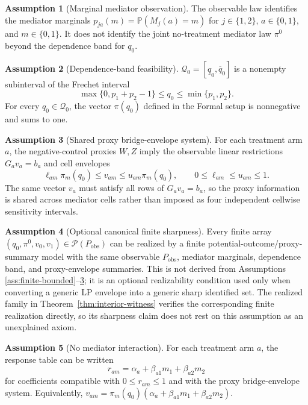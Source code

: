 \documentclass[11pt]{article}
\renewcommand{\Pr}{\mathbb{P}}
\theoremstyle{definition}
\newtheorem{assumption}{Assumption}
\theoremstyle{plain}
\theoremstyle{remark}
\begin{document}
\begin{assumption}[Marginal mediator observation]\label{ass:marginal-mediators}
The observable law identifies the mediator marginals
\(p_{ja}(m)=\Pr(M_j(a)=m)\) for \(j\in\{1,2\}\), \(a\in\{0,1\}\), and
\(m\in\{0,1\}\).  It does not identify the joint no-treatment mediator law
\(\pi^0\) beyond the dependence band for \(q_0\).
\end{assumption}

\begin{assumption}[Dependence-band feasibility]\label{ass:dependence-band}
\(\mathcal Q_0=[\underline q_0,\overline q_0]\) is a nonempty subinterval of
the Frechet interval
\[
  \max\{0,p_1+p_2-1\}\le q_0\le \min\{p_1,p_2\}.
\]
For every \(q_0\in\mathcal Q_0\), the vector \(\pi(q_0)\) defined in the
Formal setup is nonnegative and sums to one.
\end{assumption}

\begin{assumption}[Shared proxy bridge-envelope system]\label{ass:proxy-envelope}
For each treatment arm \(a\), the negative-control proxies \(W,Z\) imply the
observable linear restrictions \(G_a v_a=b_a\) and cell envelopes
\[
  \ell_{am}\pi_m(q_0)\le v_{am}\le u_{am}\pi_m(q_0),
  \qquad 0\le \ell_{am}\le u_{am}\le1 .
\]
The same vector \(v_a\) must satisfy all rows of \(G_a v_a=b_a\), so the proxy
information is shared across mediator cells rather than imposed as four
independent cellwise sensitivity intervals.
\end{assumption}

\begin{assumption}[Optional canonical finite sharpness]\label{ass:canonical-sharpness}
Every finite array \((q_0,\pi^0,v_0,v_1)\in\mathcal P(P_{\mathrm{obs}})\)
can be realized by a finite potential-outcome/proxy-summary model with the
same observable \(P_{\mathrm{obs}}\), mediator marginals, dependence band, and
proxy-envelope summaries.  This is not derived from Assumptions
\ref{ass:finite-bounded}--\ref{ass:proxy-envelope}; it is an optional
realizability condition used only when converting a generic LP envelope into a
generic sharp identified set.  The realized family in
Theorem~\ref{thm:interior-witness} verifies the corresponding finite
realization directly, so its sharpness claim does not rest on this assumption
as an unexplained axiom.
\end{assumption}

\begin{assumption}[No mediator interaction]\label{ass:no-interaction}
For each treatment arm \(a\), the response table can be written
\[
  r_{am}=\alpha_a+\beta_{a1}m_1+\beta_{a2}m_2
\]
for coefficients compatible with \(0\le r_{am}\le1\) and with the proxy
bridge-envelope system.  Equivalently,
\(v_{am}=\pi_m(q_0)(\alpha_a+\beta_{a1}m_1+\beta_{a2}m_2)\).
\end{assumption}
\end{document}
